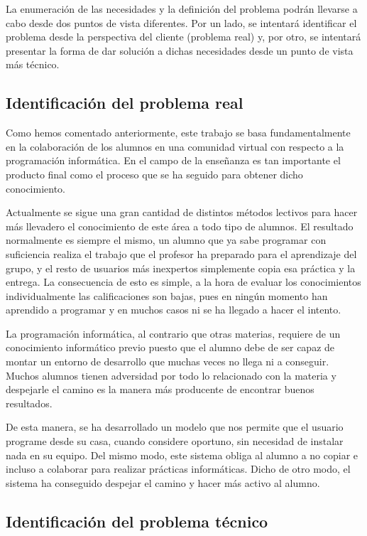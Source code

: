 La enumeración de las necesidades y la definición del problema podrán llevarse a cabo desde dos puntos de vista diferentes. Por un lado, se intentará identificar el problema desde la perspectiva del cliente (problema real) y, por otro, se intentará presentar la forma de dar solución a dichas necesidades desde un punto de vista más técnico.

\subsection{Identificación del problema real}

Como hemos comentado anteriormente, este trabajo se basa fundamentalmente en la colaboración de los alumnos en una comunidad virtual con respecto a la programación informática. En el campo de la enseñanza es tan importante el producto final como el proceso que se ha seguido para obtener dicho conocimiento.

Actualmente se sigue una gran cantidad de distintos métodos lectivos para hacer más llevadero el conocimiento de este área a todo tipo de alumnos. El resultado normalmente es siempre el mismo, un alumno que ya sabe programar con suficiencia realiza el trabajo que el profesor ha preparado para el aprendizaje del grupo, y el resto de usuarios más inexpertos simplemente copia esa práctica y la entrega. La consecuencia de esto es simple, a la hora de evaluar los conocimientos individualmente las calificaciones son bajas, pues en ningún momento han aprendido a programar y en muchos casos ni se ha llegado a hacer el intento.

La programación informática, al contrario que otras materias, requiere de un conocimiento informático previo puesto que el alumno debe de ser capaz de montar un entorno de desarrollo que muchas veces no llega ni a conseguir. Muchos alumnos tienen adversidad por todo lo relacionado con la materia y despejarle el camino es la manera más producente de encontrar buenos resultados.

De esta manera, se ha desarrollado un modelo que nos permite que el usuario programe desde su casa, cuando considere oportuno, sin necesidad de instalar nada en su equipo. Del mismo modo, este sistema obliga al alumno a no copiar e incluso a colaborar para realizar prácticas informáticas. Dicho de otro modo, el sistema ha conseguido despejar el camino y hacer más activo al alumno.

\subsection{Identificación del problema técnico}


